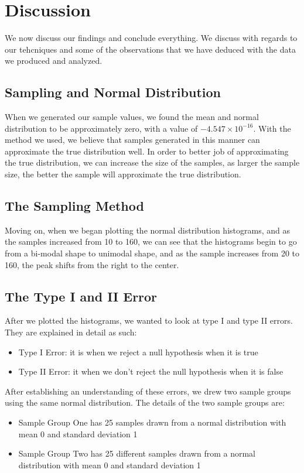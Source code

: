 \documentclass[a4paper,twocolumn]{article}
\begin{document}
\section{Discussion}
We now discuss our findings and conclude everything. We discuss with regards to our tehcniques and some of the
observations that we have deduced with the data we produced and analyzed.

\subsection{Sampling and Normal Distribution}
When we generated our sample values, we found the mean and normal distribution to be approximately zero, 
with a value of \( -4.547 \times 10^{-16} \). With the method we used, we believe that samples generated in this 
manner can approximate the true distribution well. In order to better job of approximating the true distribution,
we can increase the size of the samples, as larger the sample size, the better the sample will approximate the
true distribution. 

\subsection{The Sampling Method}
Moving on, when we began plotting the normal distribution histograms, and as the samples increased from 10 to 160,
we can see that the histograms begin to go from a bi-modal shape to unimodal shape, and as the sample increases from
20 to 160, the peak shifts from the right to the center. 

\subsection{The Type I and II Error}
After we plotted the histograms, we wanted to look at type I and type II errors. They are explained in detail as such:
\begin{itemize}
    \item Type I Error: it is when we reject a null hypothesis when it is true
    \item Type II Error: it when we don't reject the null hypothesis when it is false
\end{itemize}


After establishing an understanding of these errors, we drew two sample groups using the same normal distribution.
The details of the two sample groups are:
\begin{itemize}
    \item Sample Group One has 25 samples drawn from a normal distribution with mean 0 and standard deviation 1
    \item Sample Group Two has 25 different samples drawn from a normal distribution with mean 0 and standard
    deviation 1
\end{itemize}
\end{document}
